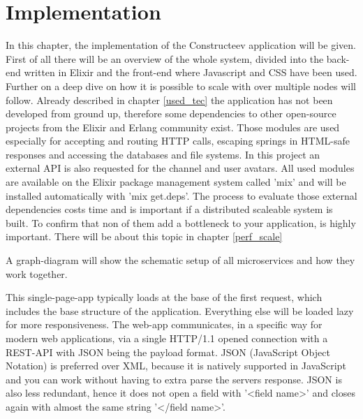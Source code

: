 \chapter{Implementation}
In this chapter, the implementation of the Constructeev application will be given. First of all there will be an overview of the whole system, divided into the back-end written in Elixir and the front-end where Javascript and CSS have been used. 
Further on a deep dive on how it is possible to scale with over multiple nodes will follow.
Already described in chapter \ref{used_tec} the application has not been developed from ground up, therefore some dependencies to other open-source projects from the Elixir and Erlang community exist. Those modules are used especially for accepting and routing HTTP calls, escaping springs in HTML-safe responses and accessing the databases and file systems. In this project an external API is also requested for the channel and user avatars. All used modules are available on the Elixir package management system called 'mix' and will be installed automatically with 'mix get.deps'. The process to evaluate those external dependencies costs time and is important if a distributed scaleable system is built. To confirm that non of them add a bottleneck to your application, is highly important. There will be about this topic in chapter \ref{perf_scale}

A graph-diagram will show the schematic setup of all microservices and how they work together.  %

This single-page-app typically loads at the base of the first request, which includes the base structure of the application. Everything else will be loaded lazy for more responsiveness. The web-app communicates, in a specific way for modern web applications, via a single HTTP/1.1 opened connection with a REST-API with JSON being the payload format. JSON (JavaScript Object Notation) is preferred over XML, because it is natively supported in JavaScript and you can work without having to extra parse the servers response. JSON is also less redundant, hence it does not open a field with '<field name>' and closes again with almost the same string '</field name>'.
 
